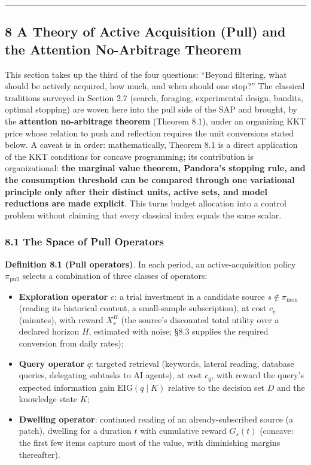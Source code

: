 \documentclass[
  11pt]{article}
\providecommand{\tightlist}{%
  \setlength{\itemsep}{0pt}\setlength{\parskip}{0pt}}
\begin{document}
\begin{center}\rule{0.5\linewidth}{0.5pt}\end{center}

\subsection{8 A Theory of Active Acquisition (Pull) and the Attention
No-Arbitrage
Theorem}\label{a-theory-of-active-acquisition-pull-and-the-attention-no-arbitrage-theorem}

This section takes up the third of the four questions: ``Beyond
filtering, what should be actively acquired, how much, and when should
one stop?'' The classical traditions surveyed in Section 2.7 (search,
foraging, experimental design, bandits, optimal stopping) are woven here
into the pull side of the SAP and brought, by the \textbf{attention
no-arbitrage theorem} (Theorem 8.1), under an organizing KKT price whose
relation to push and reflection requires the unit conversions stated
below. A caveat is in order: mathematically, Theorem 8.1 is a direct
application of the KKT conditions for concave programming; its
contribution is organizational: \textbf{the marginal value theorem,
Pandora's stopping rule, and the consumption threshold can be compared
through one variational principle only after their distinct units,
active sets, and model reductions are made explicit}. This turns budget
allocation into a control problem without claiming that every classical
index equals the same scalar.

\subsubsection{8.1 The Space of Pull
Operators}\label{the-space-of-pull-operators}

\textbf{Definition 8.1 (Pull operators)}. In each period, an
active-acquisition policy \(\pi_{\mathrm{pull}}\) selects a combination
of three classes of operators:

\begin{itemize}
\tightlist
\item
  \textbf{Exploration operator} \(e\): a trial investment in a candidate
  source \(s \notin \pi_{\mathrm{mon}}\) (reading its historical
  content, a small-sample subscription), at cost \(c_e\) (minutes), with
  reward \(X_s^H\) (the source's discounted total utility over a
  declared horizon \(H\), estimated with noise; §8.3 supplies the
  required conversion from daily rates);
\item
  \textbf{Query operator} \(q\): targeted retrieval (keywords, lateral
  reading, database queries, delegating subtasks to AI agents), at cost
  \(c_q\), with reward the query's expected information gain
  \(\mathrm{EIG}(q \mid K)\) relative to the decision set \(D\) and the
  knowledge state \(K\);
\item
  \textbf{Dwelling operator}: continued reading of an already-subscribed
  source (a patch), dwelling for a duration \(t\) with cumulative reward
  \(G_s(t)\) (concave: the first few items capture most of the value,
  with diminishing margins thereafter).
\end{itemize}
\end{document}
